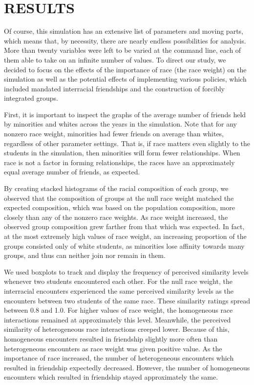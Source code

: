 
\section{RESULTS}
\label{sec:results}

Of course, this simulation has an extensive list of parameters and moving parts, which means that, by necessity, 
there are nearly endless possibilities for analysis. More than twenty variables were left to be varied at the command line, 
each of them able to take on an infinite number of values. To direct our study, we decided to focus on the effects of the 
importance of race (the race weight) on the simulation as well as the potential effects of implementing various policies, 
which included mandated interracial friendships and the construction of forcibly integrated groups.

First, it is important to inspect the graphs of the average number of friends held by minorities and whites across the years 
in the simulation. Note that for any nonzero race weight, minorities had fewer friends on average than whites, 
regardless of other parameter settings. That is, if race matters even slightly to the students in the simulation, then 
minorities will form fewer relationships. When race is not a factor in forming relationships, the races have an approximately 
equal average number of friends, as expected.

By creating stacked histograms of the racial composition of each group, we observed that the composition of groups at the null 
race weight matched the expected composition, which was based on the population composition, more closely than any of the 
nonzero race weights. As race weight increased, the observed group composition grew farther from that which was expected. In 
fact, at the most extremely high values of race weight, an increasing proportion of the groups consisted only of white 
students, as minorities lose affinity towards many groups, and thus can neither join nor remain in them.

We used boxplots to track and display the frequency of perceived similarity levels whenever two students encountered each 
other. For the null race weight, the interracial encounters experienced the same perceived similarity levels as the 
encounters between two students of the same race. These similarity ratings spread between 0.8 and 1.0. For higher values of 
race weight, the homogeneous race interactions remained at approximately this level. Meanwhile, the perceived similarity of 
heterogeneous race interactions creeped lower. Because of this, homogeneous encounters resulted in friendship slightly more 
often than heterogeneous encounters as race weight was given positive value. As the importance of race increased, the number 
of heterogeneous encounters which resulted in friendship expectedly decreased. However, the number of homogeneous encounters 
which resulted in friendship stayed approximately the same.

